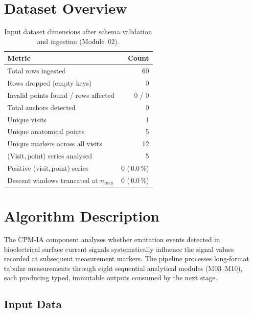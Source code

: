 \documentclass[a4paper,11pt]{article}
\begin{document}
\section{Dataset Overview}

\begin{table}[h!]
\centering
\small
\caption{Input dataset dimensions after schema validation and ingestion (Module~02).}
\begin{tabular}{lr}
\toprule
\textbf{Metric} & \textbf{Count} \\
\midrule
Total rows ingested                        & 60 \\
Rows dropped (empty keys)                  & 0 \\
Invalid points found / rows affected       & 0 / 0 \\
Total anchors detected                     & 0 \\
Unique visits                          & 1 \\
Unique anatomical points               & 5 \\
Unique markers across all visits       & 12 \\
(Visit,\,point) series analysed        & 5 \\
Positive (visit,\,point) series        & 0 (\,0.0\,\%) \\
Descent windows truncated at $n_{\max}$ & 0 (\,0.0\,\%) \\
\bottomrule
\end{tabular}
\end{table}

\section{Algorithm Description}

The CPM-IA component analyses whether excitation events detected in bioelectrical surface
current signals systematically influence the signal values recorded at subsequent measurement
markers. The pipeline processes long-format tabular measurements through eight sequential
analytical modules (M03--M10), each producing typed, immutable outputs consumed by the next
stage.

\subsection{Input Data}
\end{document}
